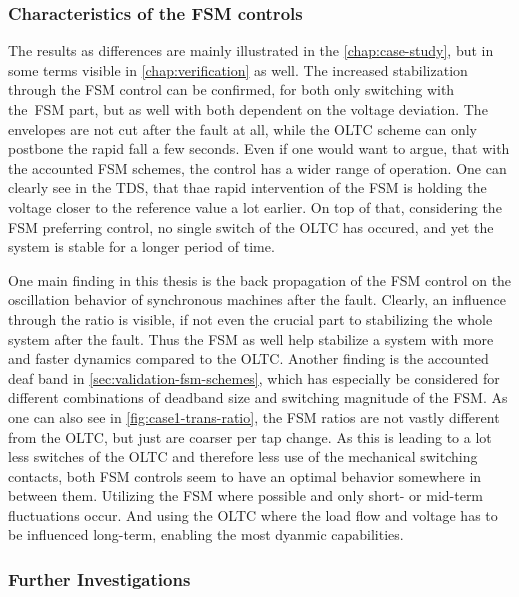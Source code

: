 \subsubsection{Characteristics of the FSM controls}

The results as differences are mainly illustrated in the \autoref{chap:case-study}, but in some terms visible in \autoref{chap:verification} as well.
The increased stabilization through the \acs{FSM} control can be confirmed, for both only switching with the \acs{FSM} part, but as well with both dependent on the voltage deviation.
The envelopes are not cut after the fault at all, while the \acs{OLTC} scheme can only postbone the rapid fall a few seconds.
Even if one would want to argue, that with the accounted \acs{FSM} schemes, the control has a wider range of operation.
One can clearly see in the \acs{TDS}, that thae rapid intervention of the \acs{FSM} is holding the voltage closer to the reference value a lot earlier.
On top of that, considering the \acs{FSM} preferring control, no single switch of the \acs{OLTC} has occured, and yet the system is stable for a longer period of time.

One main finding in this thesis is the back propagation of the \acs{FSM} control on the oscillation behavior of synchronous machines after the fault.
Clearly, an influence through the ratio is visible, if not even the crucial part to stabilizing the whole system after the fault.
Thus the \acs{FSM} as well help stabilize a system with more and faster dynamics compared to the \acs{OLTC}.
Another finding is the accounted deaf band in \autoref{sec:validation-fsm-schemes}, which has especially be considered for different combinations of deadband size and switching magnitude of the \acs{FSM}.
As one can also see in \autoref{fig:case1-trans-ratio}, the \acs{FSM} ratios are not vastly different from the \acs{OLTC}, but just are coarser per tap change.
As this is leading to a lot less switches of the \acs{OLTC} and therefore less use of the mechanical switching contacts, both \acs{FSM} controls seem to have an optimal behavior somewhere in between them.
Utilizing the \acs{FSM} where possible and only short- or mid-term fluctuations occur.
And using the \acs{OLTC} where the load flow and voltage has to be influenced long-term, enabling the most dyanmic capabilities.   

\subsubsection{Further Investigations}

